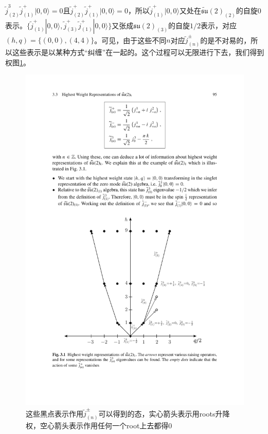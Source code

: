 $\tilde{j}_{(2)}^3\tilde{j}_{(1)}^+|0,0\rangle =0$且$\tilde{j}_{(2)}^+\tilde{j}_{(1)}^+|0,0\rangle =0$，所以$\tilde{j}_{(1)}^+|0,0\rangle $又处在$\widetilde{\mathfrak{su}}(2)_{(2)}$的自旋$0$表示。$\{\tilde{j}_{(1)}^+|0,0\rangle ,\tilde{j}_{(3)}^{+}\tilde{j}_{(1)}^{+}|0,0\rangle \}$又张成$\mathfrak{su}(2)_{(3)}$的自旋$1/2$表示，对应$(h,q)=\{(0,0),(4,4)\}$。可见，由于这些不同$n$对应$\tilde{j}_{(n)}^\pm$的是不对易的，所以这些表示是以某种方式“纠缠”在一起的。这个过程可以无限进行下去，我们得到权图\ref{fig17}。
\begin{figure}
	\centering
	\includegraphics{figs/fig17.pdf}
	\caption{这些黑点表示作用$\widetilde{j}^\pm_{(n)}$可以得到的态，实心箭头表示用roots升降权，空心箭头表示作用任何一个root上去都得0}
	\label{fig17}
\end{figure}

